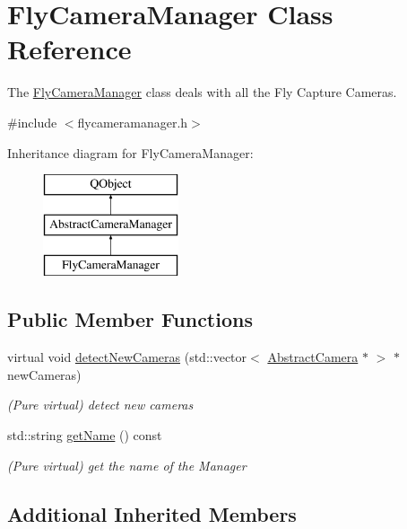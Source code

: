 \hypertarget{class_fly_camera_manager}{\section{Fly\-Camera\-Manager Class Reference}
\label{class_fly_camera_manager}
}


The \hyperlink{class_fly_camera_manager}{Fly\-Camera\-Manager} class deals with all the Fly Capture Cameras.  




{\ttfamily \#include $<$flycameramanager.\-h$>$}

Inheritance diagram for Fly\-Camera\-Manager\-:\begin{figure}[H]
\begin{center}
\leavevmode
\includegraphics[height=3.000000cm]{class_fly_camera_manager}
\end{center}
\end{figure}
\subsection*{Public Member Functions}
\begin{DoxyCompactItemize}
\item 
virtual void \hyperlink{class_fly_camera_manager_aab72966a50baaf966817c7f1265341a8}{detect\-New\-Cameras} (std\-::vector$<$ \hyperlink{class_abstract_camera}{Abstract\-Camera} $\ast$ $>$ $\ast$new\-Cameras)
\begin{DoxyCompactList}\small\item\em (Pure virtual) detect new cameras \end{DoxyCompactList}\item 
std\-::string \hyperlink{class_fly_camera_manager_a1c865e44bde9cc91829c3e875081396d}{get\-Name} () const 
\begin{DoxyCompactList}\small\item\em (Pure virtual) get the name of the Manager \end{DoxyCompactList}\end{DoxyCompactItemize}
\subsection*{Additional Inherited Members}



